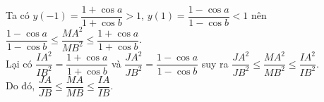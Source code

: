 \begin{bt}
{\begin{center}
		\end{center}
		Ta có $y(-1)=\dfrac{1+\cos a}{1+\cos b}>1$, $y(1)=\dfrac{1-\cos a}{1-\cos b}<1$ nên $\dfrac{1-\cos a}{1-\cos b}\leq \dfrac{MA^2}{MB^2}\leq \dfrac{1+\cos a}{1+\cos b}$.\\
		Lại có $\dfrac{IA^2}{IB^2}=\dfrac{1+\cos a}{1+\cos b}$ và $\dfrac{JA^2}{JB^2}=\dfrac{1-\cos a}{1-\cos b}$ suy ra $\dfrac{JA^2}{JB^2}\leq \dfrac{MA^2}{MB^2} \leq \dfrac{IA^2}{IB^2}$.\\
		Do đó, $\dfrac{JA}{JB}\leq \dfrac{MA}{MB}\leq \dfrac{IA}{IB}$.
	}
\end{bt}

